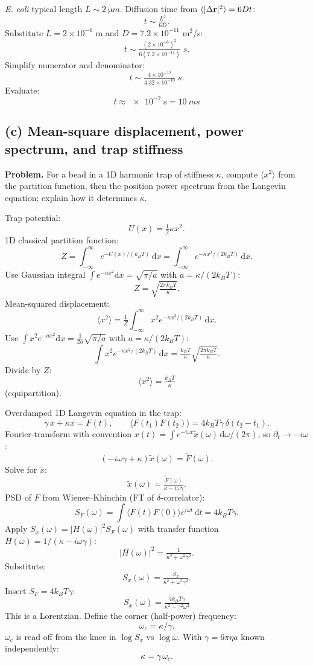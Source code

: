 \documentclass[11pt]{article}
\newcommand{\de}{\mathrm{d}}
\begin{document}
\textit{E. coli} typical length $L \sim \SI{2}{\micro m}$. Diffusion time from $\langle|\Delta\vb r|^2\rangle = 6Dt$:
\[
t \sim \tfrac{L^2}{6D}.
\]
Substitute $L = 2\times 10^{-6}$ m and $D = 7.2\times 10^{-11}$ m$^2$/s:
\[
t \sim \tfrac{(2\times 10^{-6})^2}{6(7.2\times 10^{-11})}\;\si{s}.
\]
Simplify numerator and denominator:
\[
t \sim \tfrac{4\times 10^{-12}}{4.32\times 10^{-10}}\;\si{s}.
\]
Evaluate:
\[
\boxed{\;t \approx \SI{e-2}{s} = \SI{10}{ms}\;}
\]

\subsection*{(c) Mean-square displacement, power spectrum, and trap stiffness}

\textbf{Problem.} For a bead in a 1D harmonic trap of stiffness $\kappa$, compute $\langle x^2\rangle$ from the partition function, then the position power spectrum from the Langevin equation; explain how it determines $\kappa$.

Trap potential:
\[
U(x) = \tfrac{1}{2}\kappa x^2.
\]
1D classical partition function:
\[
Z = \int_{-\infty}^\infty e^{-U(x)/(k_BT)}\,\de x = \int_{-\infty}^\infty e^{-\kappa x^2/(2 k_B T)}\,\de x.
\]
Use Gaussian integral $\int e^{-ax^2}\de x = \sqrt{\pi/a}$ with $a = \kappa/(2k_BT)$:
\[
Z = \sqrt{\tfrac{2\pi k_B T}{\kappa}}.
\]
Mean-squared displacement:
\[
\langle x^2\rangle = \tfrac{1}{Z}\int_{-\infty}^\infty x^2 e^{-\kappa x^2/(2k_BT)}\,\de x.
\]
Use $\int x^2 e^{-ax^2}\de x = \tfrac{1}{2a}\sqrt{\pi/a}$ with $a = \kappa/(2k_BT)$:
\[
\int x^2 e^{-\kappa x^2/(2k_BT)}\,\de x = \tfrac{k_B T}{\kappa}\sqrt{\tfrac{2\pi k_BT}{\kappa}}.
\]
Divide by $Z$:
\[
\boxed{\;\langle x^2\rangle = \tfrac{k_B T}{\kappa}\;}
\]
(equipartition).

Overdamped 1D Langevin equation in the trap:
\[
\gamma\,\dot x + \kappa x = F(t),\qquad \langle F(t_1)F(t_2)\rangle = 4 k_B T\gamma\,\delta(t_2-t_1).
\]
Fourier-transform with convention $x(t) = \int e^{-i\omega t}\tilde x(\omega)\,\de\omega/(2\pi)$, so $\partial_t \to -i\omega$:
\[
(-i\omega\gamma + \kappa)\tilde x(\omega) = \tilde F(\omega).
\]
Solve for $\tilde x$:
\[
\tilde x(\omega) = \tfrac{\tilde F(\omega)}{\kappa - i\omega\gamma}.
\]
PSD of $F$ from Wiener--Khinchin (FT of $\delta$-correlator):
\[
S_F(\omega) = \int\langle F(t)F(0)\rangle e^{i\omega t}\,\de t = 4 k_B T\gamma.
\]
Apply $S_x(\omega) = |H(\omega)|^2 S_F(\omega)$ with transfer function $H(\omega) = 1/(\kappa - i\omega\gamma)$:
\[
|H(\omega)|^2 = \tfrac{1}{\kappa^2 + \omega^2\gamma^2}.
\]
Substitute:
\[
S_x(\omega) = \tfrac{S_F}{\kappa^2 + \omega^2\gamma^2}.
\]
Insert $S_F = 4 k_B T\gamma$:
\[
\boxed{\;S_x(\omega) = \tfrac{4 k_B T\gamma}{\kappa^2 + \gamma^2\omega^2}\;}
\]
This is a Lorentzian. Define the corner (half-power) frequency:
\[
\omega_c = \kappa/\gamma.
\]
$\omega_c$ is read off from the knee in $\log S_x$ vs $\log\omega$. With $\gamma = 6\pi\eta a$ known independently:
\[
\kappa = \gamma\,\omega_c.
\]
\end{document}
